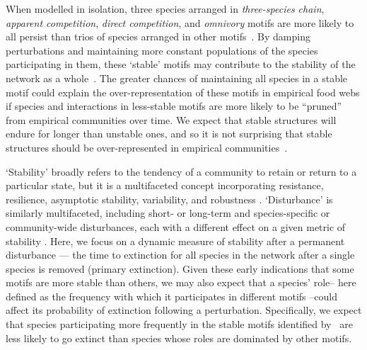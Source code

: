 \documentclass[12pt]{article}
\begin{document}
\begin{spacing}{2.0}
	When modelled in isolation, three species arranged in \emph{three-species chain}, \emph{apparent competition}, \emph{direct competition}, and \emph{omnivory} motifs are more likely to all persist than trios of species arranged in other motifs~\citep{Borrelli2015a}.
	By damping perturbations and maintaining more constant populations of the species participating in them, these `stable' motifs may contribute to the stability of the network as a whole~\citep{Borrelli2015a}. 
    The greater chances of maintaining all species in a stable motif could explain the over-representation of these motifs in empirical food webs if species and interactions in less-stable motifs are more likely to be ``pruned'' from empirical communities over time. 
    We expect that stable structures will endure for longer than unstable ones, and so it is not surprising that stable structures should be over-represented in empirical communities~\citep{Borrelli2015}.


    `Stability' broadly refers to the tendency of a community to retain or return to a particular state, but it is a multifaceted concept incorporating resistance, resilience, asymptotic stability, variability, and robustness \citep{Donohue2013}.
    `Disturbance' is similarly multifaceted, including short- or long-term and species-specific or community-wide disturbances, each with a different effect on a given metric of stability \citep{Donohue2013,Radchuck2019}.
    Here, we focus on a dynamic measure of stability after a permanent disturbance --- the time to extinction for all species in the network after a single species is removed (primary extinction).
    Given these early indications that some motifs are more stable than others, we may also expect that a species' role-- here defined as the frequency with which it participates in different motifs --could affect its probability of extinction following a perturbation.
	Specifically, we expect that species participating more frequently in the stable motifs identified by~\citet{Borrelli2015a} are less likely to go extinct than species whose roles are dominated by other motifs.
	 
	
	

\end{spacing}
\end{document}
